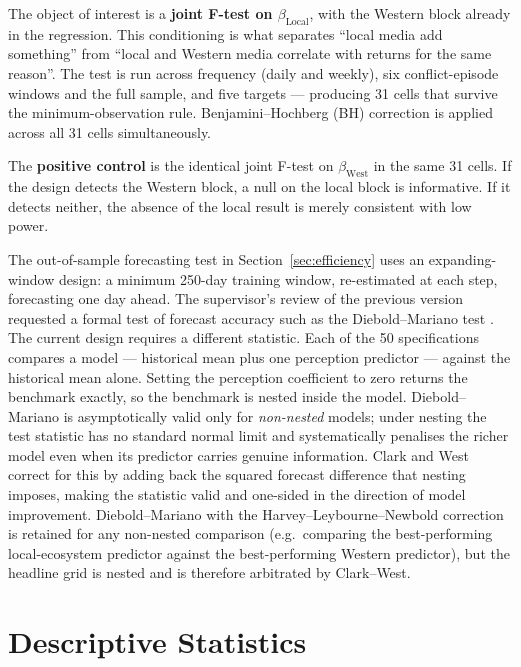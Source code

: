\documentclass[12pt,a4paper]{article}
\begin{document}
The object of interest is a \textbf{joint F-test on $\beta_{\mathrm{Local}}$}, with the Western block already in the regression. This conditioning is what separates ``local media add something'' from ``local and Western media correlate with returns for the same reason''. The test is run across frequency (daily and weekly), six conflict-episode windows and the full sample, and five targets --- producing 31 cells that survive the minimum-observation rule. Benjamini--Hochberg (BH) correction \citep{benjamini1995} is applied across all 31 cells simultaneously.

The \textbf{positive control} is the identical joint F-test on $\beta_{\mathrm{West}}$ in the same 31 cells. If the design detects the Western block, a null on the local block is informative. If it detects neither, the absence of the local result is merely consistent with low power.

The out-of-sample forecasting test in Section~\ref{sec:efficiency} uses an expanding-window design: a minimum 250-day training window, re-estimated at each step, forecasting one day ahead. The supervisor's review of the previous version requested a formal test of forecast accuracy such as the Diebold--Mariano test \citep{diebold1995}. The current design requires a different statistic. Each of the 50 specifications compares a model --- historical mean plus one perception predictor --- against the historical mean alone. Setting the perception coefficient to zero returns the benchmark exactly, so the benchmark is nested inside the model. Diebold--Mariano is asymptotically valid only for \textit{non-nested} models; under nesting the test statistic has no standard normal limit and systematically penalises the richer model even when its predictor carries genuine information. Clark and West \citep{clark2007} correct for this by adding back the squared forecast difference that nesting imposes, making the statistic valid and one-sided in the direction of model improvement. Diebold--Mariano with the Harvey--Leybourne--Newbold correction \citep{harvey1997} is retained for any non-nested comparison (e.g.\ comparing the best-performing local-ecosystem predictor against the best-performing Western predictor), but the headline grid is nested and is therefore arbitrated by Clark--West.

\section{Descriptive Statistics}
\label{sec:descriptive}
\end{document}
